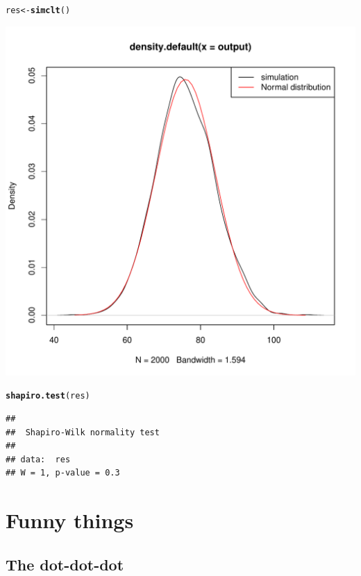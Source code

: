 \documentclass[12pt,a4paper]{scrartcl}\usepackage[]{graphicx}\usepackage[]{color}
\makeatletter
\def\maxwidth{ %
  \ifdim\Gin@nat@width>\linewidth
    \linewidth
  \else
    \Gin@nat@width
  \fi
}
\newcommand{\hlstd}[1]{\textcolor[rgb]{0.345,0.345,0.345}{#1}}%
\newcommand{\hlkwb}[1]{\textcolor[rgb]{0.69,0.353,0.396}{#1}}%
\newcommand{\hlkwd}[1]{\textcolor[rgb]{0.737,0.353,0.396}{\textbf{#1}}}%
\newenvironment{kframe}{%
 \def\at@end@of@kframe{}%
 \ifinner\ifhmode%
  \def\at@end@of@kframe{\end{minipage}}%
  \begin{minipage}{\columnwidth}%
 \fi\fi%
 \def\FrameCommand##1{\hskip\@totalleftmargin \hskip-\fboxsep
 \colorbox{shadecolor}{##1}\hskip-\fboxsep
     \hskip-\linewidth \hskip-\@totalleftmargin \hskip\columnwidth}%
 \MakeFramed {\advance\hsize-\width
   \@totalleftmargin\z@ \linewidth\hsize
   \@setminipage}}%
 {\par\unskip\endMakeFramed%
 \at@end@of@kframe}
\newenvironment{knitrout}{}{} %
\makeatother
\begin{document}
\begin{Answer}
\begin{knitrout}
\begin{kframe}
\begin{alltt}
\hlstd{res} \hlkwb{<-} \hlkwd{simclt}\hlstd{()}
\end{alltt}
\end{kframe}
\includegraphics[width=\maxwidth]{figure/unnamed-chunk-7-1} 
\begin{kframe}\begin{alltt}
\hlkwd{shapiro.test}\hlstd{(res)}
\end{alltt}
\begin{verbatim}
## 
## 	Shapiro-Wilk normality test
## 
## data:  res
## W = 1, p-value = 0.3
\end{verbatim}
\end{kframe}
\end{knitrout}
\end{Answer}

\section{Funny things}


\subsection{The dot-dot-dot}
\end{document}
